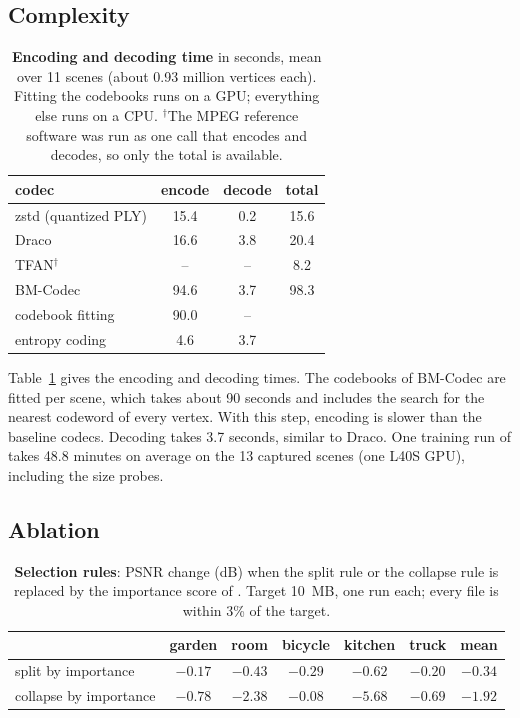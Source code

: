 \subsection{Complexity}
\label{sec:time}

\begin{table}[t]\centering\footnotesize
\caption{\textbf{Encoding and decoding time} in seconds, mean over 11 scenes (about 0.93 million vertices each). Fitting the codebooks runs on a GPU; everything else runs on a CPU. $^\dagger$The MPEG reference software was run as one call that encodes and decodes, so only the total is available.}
\label{tab:time}
\setlength{\tabcolsep}{6pt}
\begin{tabular}{@{}lccc@{}}
\toprule
codec & encode & decode & total \\
\midrule
zstd (quantized PLY) & 15.4 & 0.2 & 15.6 \\
Draco & 16.6 & 3.8 & 20.4 \\
TFAN$^\dagger$ & -- & -- & 8.2 \\
\midrule
BM-Codec & 94.6 & 3.7 & 98.3 \\
\quad codebook fitting & 90.0 & -- & \\
\quad entropy coding & 4.6 & 3.7 & \\
\bottomrule
\end{tabular}
\end{table}

Table~\ref{tab:time} gives the encoding and decoding times. The codebooks of BM-Codec are fitted per scene, which takes about 90 seconds and includes the search for the nearest codeword of every vertex. With this step, encoding is slower than the baseline codecs. Decoding takes 3.7 seconds, similar to Draco. One training run of \BM takes 48.8 minutes on average on the 13 captured scenes (one L40S GPU), including the size probes.

\subsection{Ablation}
\label{sec:abl}

\begin{table}[t]\centering\footnotesize
\caption{\textbf{Selection rules}: PSNR change (dB) when the split rule or the collapse rule is replaced by the importance score of \MS. Target 10~MB, one run each; every file is within 3\% of the target.}
\label{tab:abl}
\setlength{\tabcolsep}{3.2pt}
\begin{tabular}{@{}lcccccc@{}}
\toprule
 & garden & room & bicycle & kitchen & truck & mean \\
\midrule
split by importance & $-0.17$ & $-0.43$ & $-0.29$ & $-0.62$ & $-0.20$ & $-0.34$ \\
collapse by importance & $-0.78$ & $-2.38$ & $-0.08$ & $-5.68$ & $-0.69$ & $-1.92$ \\
\bottomrule
\end{tabular}
\end{table}

